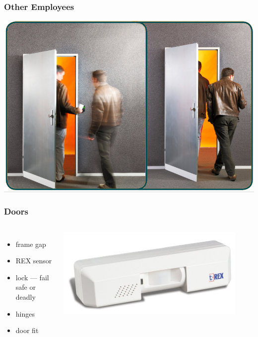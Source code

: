 \documentclass[]{beamer}
\begin{document}
\begin{frame}
\end{frame}



\begin{frame}
  \frametitle{Other Employees}
  \includegraphics[width=.9\textwidth]{tailgating}
\end{frame}

\begin{frame}
  \frametitle{Doors}
  \begin{columns}[c]
  \begin{itemize}
    \item frame gap
    \item REX sensor
    \item lock --- fail safe or deadly
    \item hinges
    \item door fit
  \end{itemize}
  \includegraphics[width=0.9\textwidth]{T-REX}
\end{columns}
\end{frame}
\end{document}

